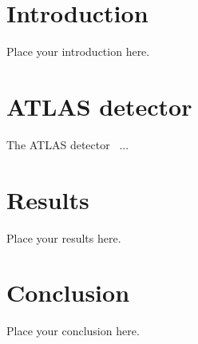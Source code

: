 \documentclass[UKenglish,texlive=2013]{\ATLASLATEXPATH atlasdoc}
\begin{document}
\maketitle

\tableofcontents


\section{Introduction}
\label{sec:intro}

Place your introduction here.


\section{ATLAS detector}
\label{sec:detector}

The ATLAS detector~\cite{PERF-2007-01} ...
% 


\section{Results}
\label{sec:result}

Place your results here.



\section{Conclusion}
\label{sec:conclusion}

Place your conclusion here.


\end{document}
